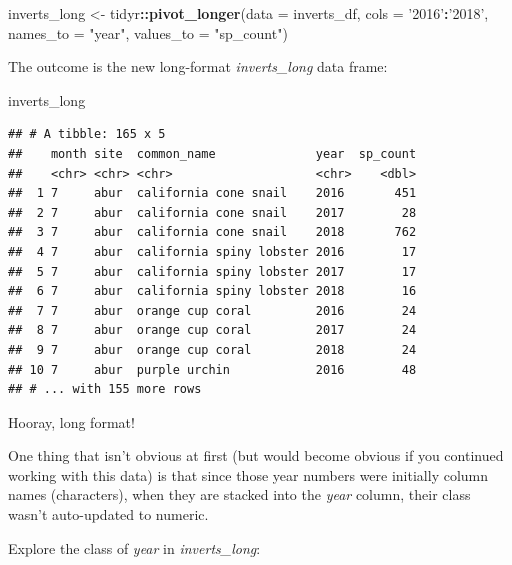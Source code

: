 \documentclass[]{book}
\newenvironment{Shaded}{\begin{snugshade}}{\end{snugshade}}
\newcommand{\DataTypeTok}[1]{\textcolor[rgb]{0.13,0.29,0.53}{#1}}
\newcommand{\KeywordTok}[1]{\textcolor[rgb]{0.13,0.29,0.53}{\textbf{#1}}}
\newcommand{\NormalTok}[1]{#1}
\newcommand{\OperatorTok}[1]{\textcolor[rgb]{0.81,0.36,0.00}{\textbf{#1}}}
\newcommand{\StringTok}[1]{\textcolor[rgb]{0.31,0.60,0.02}{#1}}
\begin{document}
\begin{Shaded}
\begin{Highlighting}[]
\NormalTok{inverts_long <-}\StringTok{ }\NormalTok{tidyr}\OperatorTok{::}\KeywordTok{pivot_longer}\NormalTok{(}\DataTypeTok{data =}\NormalTok{ inverts_df, }
                                    \DataTypeTok{cols =} \StringTok{'2016'}\OperatorTok{:}\StringTok{'2018'}\NormalTok{,}
                                    \DataTypeTok{names_to =} \StringTok{"year"}\NormalTok{,}
                                    \DataTypeTok{values_to =} \StringTok{"sp_count"}\NormalTok{)}
\end{Highlighting}
\end{Shaded}

The outcome is the new long-format \emph{inverts\_long} data frame:

\begin{Shaded}
\begin{Highlighting}[]
\NormalTok{inverts_long}
\end{Highlighting}
\end{Shaded}

\begin{verbatim}
## # A tibble: 165 x 5
##    month site  common_name              year  sp_count
##    <chr> <chr> <chr>                    <chr>    <dbl>
##  1 7     abur  california cone snail    2016       451
##  2 7     abur  california cone snail    2017        28
##  3 7     abur  california cone snail    2018       762
##  4 7     abur  california spiny lobster 2016        17
##  5 7     abur  california spiny lobster 2017        17
##  6 7     abur  california spiny lobster 2018        16
##  7 7     abur  orange cup coral         2016        24
##  8 7     abur  orange cup coral         2017        24
##  9 7     abur  orange cup coral         2018        24
## 10 7     abur  purple urchin            2016        48
## # ... with 155 more rows
\end{verbatim}

Hooray, long format!

One thing that isn't obvious at first (but would become obvious if you continued working with this data) is that since those year numbers were initially column names (characters), when they are stacked into the \emph{year} column, their class wasn't auto-updated to numeric.

Explore the class of \emph{year} in \emph{inverts\_long}:

\begin{Shaded}
\end{Shaded}
\end{document}
